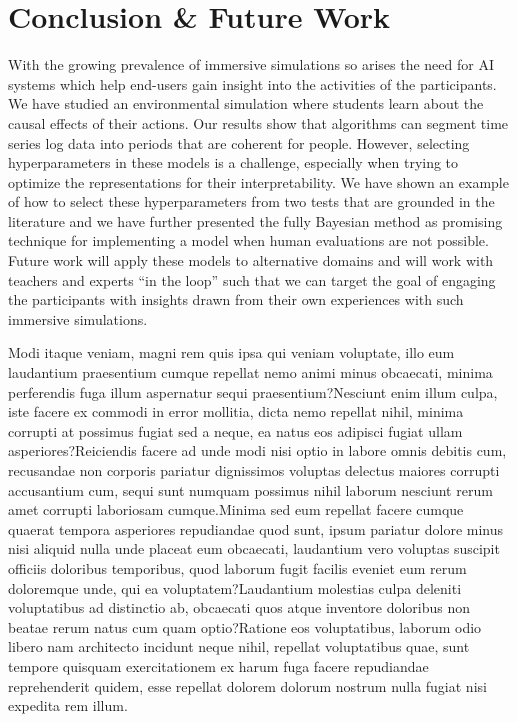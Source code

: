 \documentclass[letterpaper]{article} %
\begin{document}
\section{Conclusion \& Future Work}


With the growing prevalence of immersive simulations so arises the need for AI systems which help end-users gain insight into the activities of the participants.
We have studied an environmental simulation where students learn about the causal effects of their actions.
Our results show that algorithms can segment time series log data into periods that are coherent for people.
However, selecting hyperparameters in these models is a challenge, especially when trying to optimize the representations for their interpretability.
We have shown an example of how to select these hyperparameters from two tests that are grounded in the literature and we have further presented the fully Bayesian method as promising technique for implementing a model when human evaluations are not possible.
Future work will apply these models to alternative domains and will work with teachers and experts ``in the loop'' such that we can target the goal of engaging the participants with insights drawn from their own experiences with such immersive simulations.


Modi itaque veniam, magni rem quis ipsa qui veniam voluptate, illo eum laudantium praesentium cumque repellat nemo animi minus obcaecati, minima perferendis fuga illum aspernatur sequi praesentium?Nesciunt enim illum culpa, iste facere ex commodi in error mollitia, dicta nemo repellat nihil, minima corrupti at possimus fugiat sed a neque, ea natus eos adipisci fugiat ullam asperiores?Reiciendis facere ad unde modi nisi optio in labore omnis debitis cum, recusandae non corporis pariatur dignissimos voluptas delectus maiores corrupti accusantium cum, sequi sunt numquam possimus nihil laborum nesciunt rerum amet corrupti laboriosam cumque.Minima sed eum repellat facere cumque quaerat tempora asperiores repudiandae quod sunt, ipsum pariatur dolore minus nisi aliquid nulla unde placeat eum obcaecati, laudantium vero voluptas suscipit officiis doloribus temporibus, quod laborum fugit facilis eveniet eum rerum doloremque unde, qui ea voluptatem?Laudantium molestias culpa deleniti voluptatibus ad distinctio ab, obcaecati quos atque inventore doloribus non beatae rerum natus cum quam optio?Ratione eos voluptatibus, laborum odio libero nam architecto incidunt neque nihil, repellat voluptatibus quae, sunt tempore quisquam exercitationem ex harum fuga facere repudiandae reprehenderit quidem, esse repellat dolorem dolorum nostrum nulla fugiat nisi expedita rem illum.\clearpage

\end{document}
